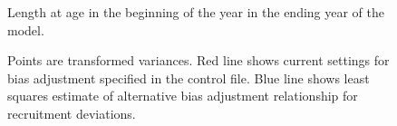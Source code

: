 \documentclass[
]{scrartcl}
\begin{document}
\clearpage

\begin{figure}


\caption{\label{fig-growth}Length at age in the beginning of the year in
the ending year of the model.}

\end{figure}%

\begin{figure}


\caption{\label{fig-biasadj}Points are transformed variances. Red line
shows current settings for bias adjustment specified in the control
file. Blue line shows least squares estimate of alternative bias
adjustment relationship for recruitment deviations.}

\end{figure}%
\end{document}
